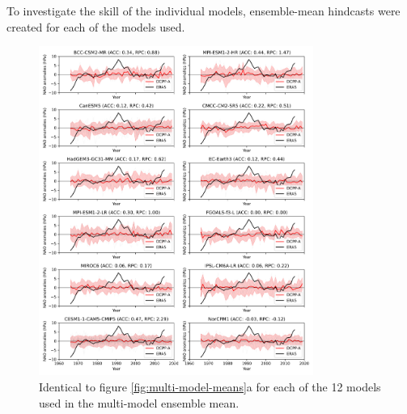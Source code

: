 \documentclass{article}
\begin{document}
To investigate the skill of the individual models, ensemble-mean hindcasts were created for each of the models used. 

\begin{figure}
    \centering
    \includegraphics[width=0.8\textwidth]{plots/nao_ensemble_mean_and_individual_members_subplots.png}
    \caption{Identical to figure \ref*{fig:multi-model-means}a for each of the 12 models used in the multi-model ensemble mean.}
    \label{fig:ind-models-raw}
\end{figure}
\end{document}
